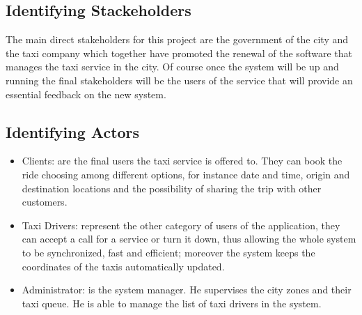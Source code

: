 \documentclass[a4paper,11pt]{report} %
\begin{document}
			
	\subsection{Identifying Stackeholders} The main direct stakeholders for this project are the government of the city and the taxi company which together have promoted the renewal of the software that manages the taxi service in the city. Of course once the system will be up and running the final stakeholders will be the users of the service that will provide an essential feedback on the new system.
	
	\subsection{Identifying Actors}
		\begin{itemize}
			\item Clients: are the final users the taxi service is offered to. They can book the ride choosing among different options, for instance date and time, origin and destination locations and the possibility of sharing the trip with other customers.
			\item Taxi Drivers: represent the other category of users of the application, they can accept a call for a service or turn it down, thus allowing the whole system to be synchronized, fast and efficient; moreover the system keeps the coordinates of the taxis automatically updated.
			
			\item Administrator: is the system manager. He supervises the city zones and their taxi queue. He is able to manage the list of taxi drivers in the system.
		\end{itemize}
	
\end{document}

